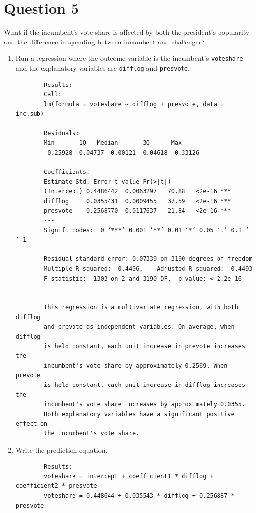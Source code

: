 \documentclass[12pt,letterpaper]{article}
\begin{document}
	\newpage	

\section*{Question 5}
\noindent What if the incumbent's vote share is affected by both the president's popularity and the difference in spending between incumbent and challenger? 
	\begin{enumerate}
		\item Run a regression where the outcome variable is the incumbent's \texttt{voteshare} and the explanatory variables are \texttt{difflog} and \texttt{presvote}.
		
		 
		
		\begin{verbatim} 
		Results: 
		Call:
		lm(formula = voteshare ~ difflog + presvote, data = inc.sub)
		
		Residuals:
		Min       1Q   Median       3Q      Max 
		-0.25928 -0.04737 -0.00121  0.04618  0.33126 
		
		Coefficients:
		Estimate Std. Error t value Pr(>|t|)    
		(Intercept) 0.4486442  0.0063297   70.88   <2e-16 ***
		difflog     0.0355431  0.0009455   37.59   <2e-16 ***
		presvote    0.2568770  0.0117637   21.84   <2e-16 ***
		---
		Signif. codes:  0 ‘***’ 0.001 ‘**’ 0.01 ‘*’ 0.05 ‘.’ 0.1 ‘ ’ 1
		
		Residual standard error: 0.07339 on 3190 degrees of freedom
		Multiple R-squared:  0.4496,	Adjusted R-squared:  0.4493 
		F-statistic:  1303 on 2 and 3190 DF,  p-value: < 2.2e-16
		
		
		This regression is a multivariate regression, with both difflog 
		and prevote as independent variables. On average, when difflog 
		is held constant, each unit increase in prevote increases the 
		incumbent's vote share by approximately 0.2569. When prevote 
		is held constant, each unit increase in difflog increases the 
		incumbent's vote share increases by approximately 0.0355. 
		Both explanatory variables have a significant positive effect on 
		the incumbent's vote share.
		\end{verbatim}
\newpage	
		\item Write the prediction equation.
		
		\begin{verbatim} 
		Results: 
		voteshare = intercept + coefficient1 * difflog + coefficient2 * presvote
		voteshare = 0.448644 + 0.035543 * difflog + 0.256887 * presvote
		\end{verbatim}
		

\end{enumerate}
\end{document}
